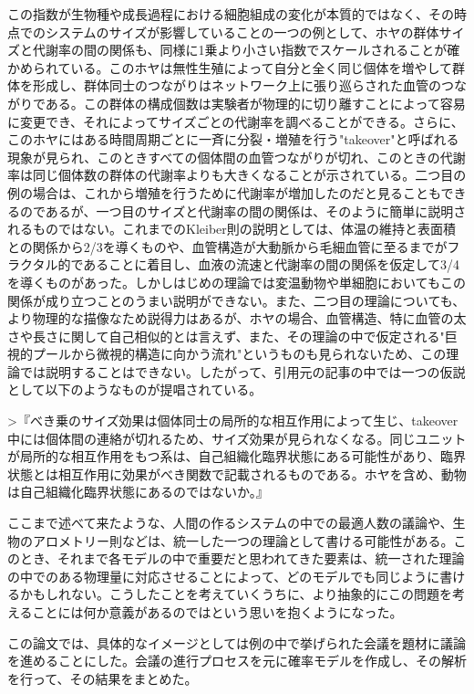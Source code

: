 この指数が生物種や成長過程における細胞組成の変化が本質的ではなく、その時点でのシステムのサイズが影響していることの一つの例として、ホヤの群体サイズと代謝率の間の関係も、同様に1乗より小さい指数でスケールされることが確かめられている。このホヤは無性生殖によって自分と全く同じ個体を増やして群体を形成し、群体同士のつながりはネットワーク上に張り巡らされた血管のつながりである。この群体の構成個数は実験者が物理的に切り離すことによって容易に変更でき、それによってサイズごとの代謝率を調べることができる。さらに、このホヤにはある時間周期ごとに一斉に分裂・増殖を行う"takeover"と呼ばれる現象が見られ、このときすべての個体間の血管つながりが切れ、このときの代謝率は同じ個体数の群体の代謝率よりも大きくなることが示されている。二つ目の例の場合は、これから増殖を行うために代謝率が増加したのだと見ることもできるのであるが、一つ目のサイズと代謝率の間の関係は、そのように簡単に説明されるものではない。これまでのKleiber則の説明としては、体温の維持と表面積との関係から2/3を導くものや、血管構造が大動脈から毛細血管に至るまでがフラクタル的であることに着目し、血液の流速と代謝率の間の関係を仮定して3/4を導くものがあった。しかしはじめの理論では変温動物や単細胞においてもこの関係が成り立つことのうまい説明ができない。また、二つ目の理論についても、より物理的な描像なため説得力はあるが、ホヤの場合、血管構造、特に血管の太さや長さに関して自己相似的とは言えず、また、その理論の中で仮定される"巨視的プールから微視的構造に向かう流れ"というものも見られないため、この理論では説明することはできない。したがって、引用元の記事の中では一つの仮説として以下のようなものが提唱されている。

>『べき乗のサイズ効果は個体同士の局所的な相互作用によって生じ、takeover中には個体間の連絡が切れるため、サイズ効果が見られなくなる。同じユニットが局所的な相互作用をもつ系は、自己組織化臨界状態にある可能性があり、臨界状態とは相互作用に効果がべき関数で記載されるものである。ホヤを含め、動物は自己組織化臨界状態にあるのではないか。』


ここまで述べて来たような、人間の作るシステムの中での最適人数の議論や、生物のアロメトリー則などは、統一した一つの理論として書ける可能性がある。このとき、それまで各モデルの中で重要だと思われてきた要素は、統一された理論の中でのある物理量に対応させることによって、どのモデルでも同じように書けるかもしれない。こうしたことを考えていくうちに、より抽象的にこの問題を考えることには何か意義があるのではという思いを抱くようになった。

この論文では、具体的なイメージとしては例の中で挙げられた会議を題材に議論を進めることにした。会議の進行プロセスを元に確率モデルを作成し、その解析を行って、その結果をまとめた。
